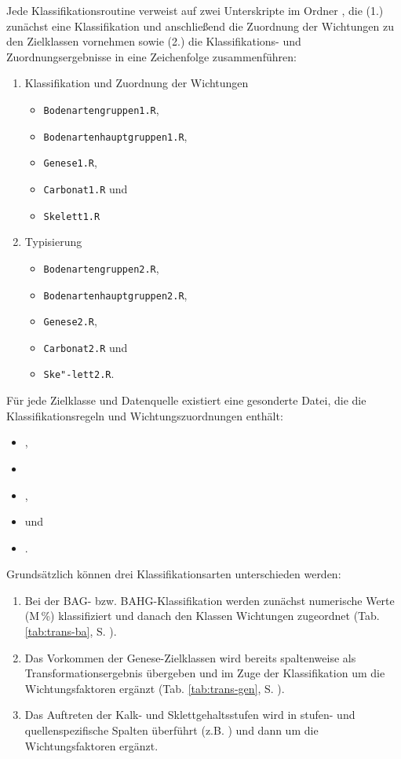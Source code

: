 Jede Klassifikationsroutine verweist auf zwei Unterskripte im Ordner , die (1.) zunächst eine  Klassifikation und anschließend die Zuordnung der Wichtungen zu den Zielklassen vornehmen  sowie (2.) die Klassifikations- und Zuordnungsergebnisse in eine Zeichenfolge zusammenführen:
\begin{enumerate}
\item Klassifikation und Zuordnung der Wichtungen
\begin{itemize}
\item \texttt{Bodenartengruppen1.R}, 
\item \texttt{Bodenartenhauptgruppen1.R},
\item \texttt{Genese1.R},
\item \texttt{Carbonat1.R} und
\item \texttt{Skelett1.R} 
\end{itemize}
\item Typisierung
\begin{itemize}
\item \texttt{Bodenartengruppen2.R}, 
\item \texttt{Bodenartenhauptgruppen2.R}, 
\item \texttt{Genese2.R}, 
\item \texttt{Carbonat2.R} und 
\item \texttt{Ske"-lett2.R}. 
\end{itemize}
\end{enumerate}

Für jede Zielklasse und Datenquelle existiert eine gesonderte Datei, die die Klassifikationsregeln und Wichtungszuordnungen enthält: 
\begin{itemize}
\item {}, 
\item {} 
\item {}, 
\item {} und 
\item {}.
\end{itemize}

Grundsätzlich können drei Klassifikationsarten unterschieden werden:
\begin{enumerate}
\item Bei der BAG- bzw. BAHG-Klassifikation werden zunächst numerische Werte (M\,\%) klassifiziert  und danach den Klassen Wichtungen zugeordnet (Tab. \ref{tab:trans-ba}, S. \pageref{tab:trans-ba}).
\item Das Vorkommen der Genese-Zielklassen wird bereits  spaltenweise als Transformationsergebnis übergeben und im Zuge der Klassifikation um die Wichtungsfaktoren ergänzt (Tab. \ref{tab:trans-gen}, S. \pageref{tab:trans-gen}).
\item Das Auftreten der Kalk- und Sklettgehaltsstufen wird in stufen- und quellenspezifische Spalten überführt (z.B. ) und dann um die Wichtungsfaktoren ergänzt.
\end{enumerate}

